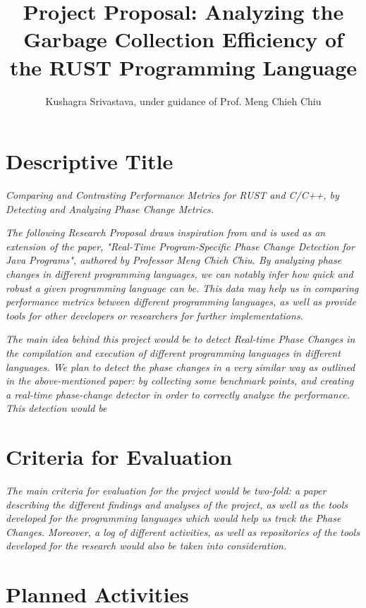 \documentclass[11pt]{article}
\title{Project Proposal: Analyzing the Garbage Collection Efficiency of the RUST Programming Language}
\author{Kushagra Srivastava, under guidance of Prof. Meng Chieh Chiu}
\makeatletter
\let\inserttitle\@title
\let\insertauthor\@author
\makeatother
\begin{document}
\begin{center}
  \LARGE{\inserttitle}

  \Large{\insertauthor}
\end{center}

\section{Descriptive Title}

\textit{Comparing and Contrasting Performance Metrics for RUST and C/C++, by Detecting and Analyzing Phase Change Metrics.}

\vspace{0.1in}

\textit{The following Research Proposal draws inspiration from and is used as an extension of the paper, "Real-Time Program-Specific Phase Change Detection for
Java Programs", authored by Professor Meng Chieh Chiu. By analyzing phase changes in different programming languages, we can notably infer how quick and robust a given programming language can be. This data may help us in comparing performance metrics between different programming languages, as well as provide tools for other developers or researchers for further implementations.}

\vspace{0.1in}

\textit{The main idea behind this project would be to detect Real-time Phase Changes in the compilation and execution of different programming languages in different languages. We plan to detect the phase changes in a very similar way as outlined in the above-mentioned paper: by collecting some benchmark points, and creating a real-time phase-change detector in order to correctly analyze the performance. This detection would be }

\section{Criteria for Evaluation}

\textit{The main criteria for evaluation for the project would be two-fold: a paper describing the different findings and analyses of the project, as well as the tools developed for the programming languages which would help us track the Phase Changes. Moreover, a log of different activities, as well as repositories of the tools developed for the research would also be taken into consideration.}

\section{Planned Activities}
\end{document}
